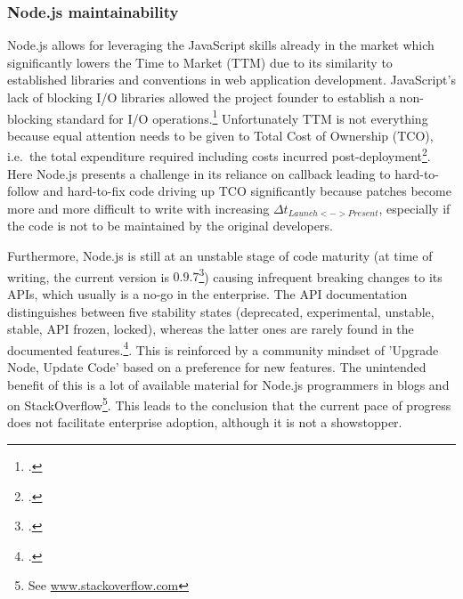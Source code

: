 \subsubsection{Node.js maintainability}

Node.js allows for leveraging the JavaScript skills already in the market which
significantly lowers the Time to Market (TTM)
due to its similarity to established libraries and conventions in web application
development. JavaScript's lack of blocking I/O libraries allowed the project
founder to establish a non-blocking standard for I/O operations.\footcite[Cf.][]{Croucher_2012}
Unfortunately TTM is not everything because equal attention needs
to be given to Total Cost of Ownership (TCO), i.e.\ the total expenditure required including costs incurred
post-deployment\footcite[Cf.][203-207]{holtsnider_2010}. 
Here Node.js presents a challenge in its reliance on callback
leading to hard-to-follow and hard-to-fix code driving up TCO significantly
because patches become more and more difficult to write with increasing $\Delta
t_{Launch<->Present}$, especially if the code is not to be maintained by the %
original developers.

Furthermore, Node.js is still at an unstable stage of code maturity (at time of
writing, the current version is $0.9.7$\footcite[Cf.][]{node_unstable_2013})
causing infrequent breaking changes to its APIs, which usually is a no-go in the enterprise.
The API documentation distinguishes between five stability states (deprecated,
experimental, unstable, stable, API frozen, locked), whereas the latter ones are
rarely found in the documented features.\footcite[Cf.][] {node_2012}.
This is reinforced by a community mindset of 'Upgrade Node, Update Code' based
on a preference for new features. The unintended benefit of this is a lot of
available material for Node.js programmers in blogs and on
StackOverflow\footnote{See \url{www.stackoverflow.com}}.
This leads to the conclusion that the current pace of progress does not
facilitate enterprise adoption, although it is not a showstopper.

